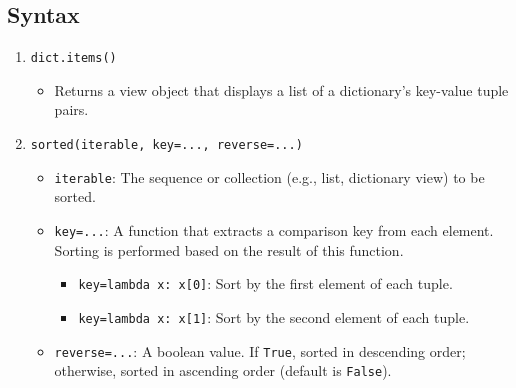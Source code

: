 \subsection{Syntax}
\begin{summary}

    \begin{enumerate}
        \item \texttt{dict.items()}
        \begin{itemize}
            \item Returns a view object that displays a list of a dictionary's key-value tuple pairs.
        \end{itemize}
        \item \texttt{sorted(iterable,\ key=...,\ reverse=...)}
        \begin{itemize}
            \item \texttt{iterable}: The sequence or collection (e.g., list, dictionary view) to be sorted.
            \item \texttt{key=...}: A function that extracts a comparison key from each element. Sorting is performed based on the result of this function.
            \begin{itemize}
                \item \texttt{key=lambda x: x[0]}: Sort by the first element of each tuple.
                \item \texttt{key=lambda x: x[1]}: Sort by the second element of each tuple.
            \end{itemize}
            \item \texttt{reverse=...}: A boolean value. If \texttt{True}, sorted in descending order; otherwise, sorted in ascending order (default is \texttt{False}).
        \end{itemize}
    \end{enumerate}

\end{summary}